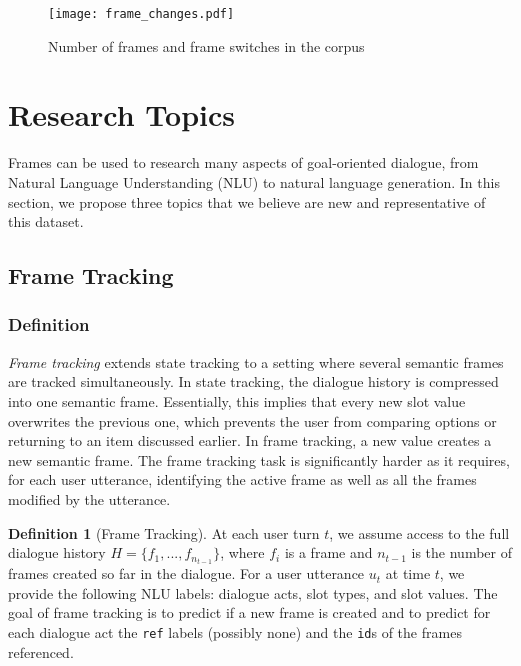 \documentclass{article}
\theoremstyle{definition}
\newtheorem{definition}{Definition}[]
\begin{document}
\begin{figure}[b!]
	\begin{center}
	\texttt{[image: frame\_changes.pdf]}
    \caption{Number of frames and frame switches in the corpus}
    \label{fig:frames_stats}
    \end{center}
\end{figure}

\section{Research Topics}
\label{sec:challenges}
Frames can be used to research many aspects of goal-oriented dialogue, from Natural Language Understanding (NLU) to natural language generation. In this section, we propose three topics that we believe are new and representative of this dataset.
\subsection{Frame Tracking}
\subsubsection{Definition}
\label{frameTrackDef}
\emph{Frame tracking} extends state tracking \citep{Henderson:15,Williams:16b} to a setting where several semantic frames are tracked simultaneously. In state tracking, the dialogue history is compressed into one semantic frame. Essentially, this implies that every new slot value overwrites the previous one, which prevents the user from comparing options or returning to an item discussed earlier. In frame tracking, a new value creates a new semantic frame. The frame tracking task is significantly harder as it requires, for each user utterance, identifying the active frame as well as all the frames modified by the utterance.

\begin{definition}[Frame Tracking]
At each user turn $t$, we assume access to the full dialogue history $H = \{f_1,...,f_{n_{t-1}}\}$, where $f_i$ is a frame and $n_{t-1}$ is the number of frames created so far in the dialogue. For a user utterance $u_t$ at time $t$, we provide the following NLU labels: dialogue acts, slot types, and slot values. The goal of frame tracking is to predict if a new frame is created and to predict for each dialogue act the \texttt{ref} labels (possibly none) and the \texttt{id}s of the frames referenced.
\end{definition}
\end{document}
